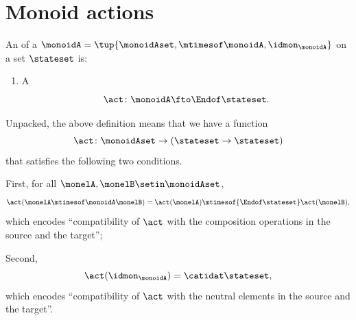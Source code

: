 
\section{Monoid actions}
\label{sec:actions}



\begin{ctdefinition}
    \label{def:monoid-cov-action}
    An  of a  $\monoidA = \tup{\monoidAset, \mtimesof\monoidA, \idmon_\monoidA}$ on a set $\stateset$ is:

    \constit
    \begin{enumerate}
        \item A 
              \begin{equation}
                  \label{eq:act-monoid}
                  \act \colon \monoidA \fto \Endof\stateset.
              \end{equation}
    \end{enumerate}
\end{ctdefinition}

Unpacked, the above definition means that we have a function
\begin{equation}
     \act \colon  \monoidAset \to (\stateset \to \stateset)
\end{equation}
that satisfies the following two conditions.
 
First, for all $\monelA, \monelB \setin \monoidAset$,
\begin{equation}
    \label{eq:act-to-endo-comp-compatibility}
    \act(\monelA \mtimesof\monoidA \monelB) = \act(\monelA) \mtimesof{\Endof\stateset} \act(\monelB), 
\end{equation}
which encodes ``compatibility of $\act$ with the composition operations in the source and the target'';

Second, 
\begin{equation}\label{eq:act-neutral-element-condit}
    \act(\idmon_\monoidA) = \catidat\stateset,
\end{equation}
which encodes ``compatibility of $\act$ with the neutral elements in the source and the target''. 

